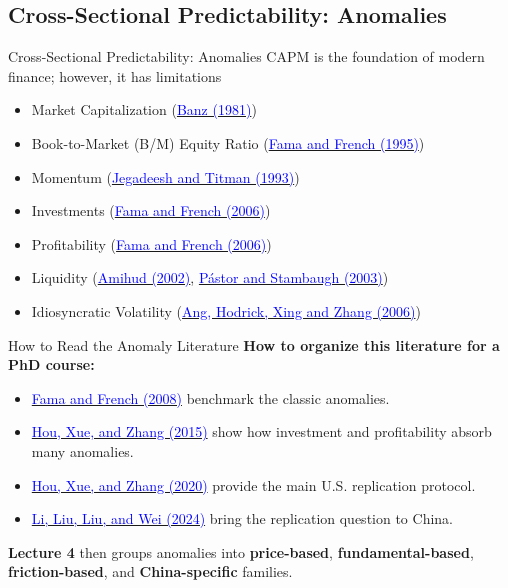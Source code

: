 \documentclass{beamer}
\begin{document}
\subsection{Cross-Sectional Predictability: Anomalies}
\begin{frame}{Cross-Sectional Predictability: Anomalies}
	CAPM is the foundation of modern finance; however, it has limitations
	\begin{itemize}
		\item Market Capitalization (\href{https://doi.org/10.1016/0304-405X(81)90018-0}{\textcolor{blue}{Banz (1981)}})
		\item Book-to-Market (B/M) Equity Ratio (\href{https://doi.org/10.1111/j.1540-6261.1995.tb05169.x}{\textcolor{blue}{Fama and French (1995)}})
		\item Momentum (\href{https://doi.org/10.1111/j.1540-6261.1993.tb04702.x}{\textcolor{blue}{Jegadeesh and Titman (1993)}})
		\item Investments (\href{https://doi.org/10.1016/j.jfineco.2005.09.009}{\textcolor{blue}{Fama and French (2006)}})
		\item Profitability (\href{https://doi.org/10.1016/j.jfineco.2005.09.009}{\textcolor{blue}{Fama and French (2006)}})
		\item Liquidity (\href{https://doi.org/10.1016/S1386-4181(01)00024-6}{\textcolor{blue}{Amihud (2002)}}, \href{https://doi.org/10.1086/374184}{\textcolor{blue}{Pástor and Stambaugh (2003)}})
		\item Idiosyncratic Volatility (\href{https://doi.org/10.1111/j.1540-6261.2006.00836.x}{\textcolor{blue}{Ang, Hodrick, Xing and Zhang (2006)}})
	\end{itemize}
\end{frame}

\begin{frame}{How to Read the Anomaly Literature}
	\textbf{How to organize this literature for a PhD course:}
	\begin{itemize}
		\item \href{https://doi.org/10.1111/j.1540-6261.2008.01371.x}{\textcolor{blue}{Fama and French (2008)}} benchmark the classic anomalies.
		\item \href{https://doi.org/10.1093/rfs/hhu068}{\textcolor{blue}{Hou, Xue, and Zhang (2015)}} show how investment and profitability absorb many anomalies.
		\item \href{https://doi.org/10.1093/rfs/hhy131}{\textcolor{blue}{Hou, Xue, and Zhang (2020)}} provide the main U.S. replication protocol.
		\item \href{https://doi.org/10.1287/mnsc.2023.4904}{\textcolor{blue}{Li, Liu, Liu, and Wei (2024)}} bring the replication question to China.
	\end{itemize}

	\textbf{Lecture 4} then groups anomalies into \textbf{price-based}, \textbf{fundamental-based},\\
	\textbf{friction-based}, and \textbf{China-specific} families.

\end{frame}
\end{document}
